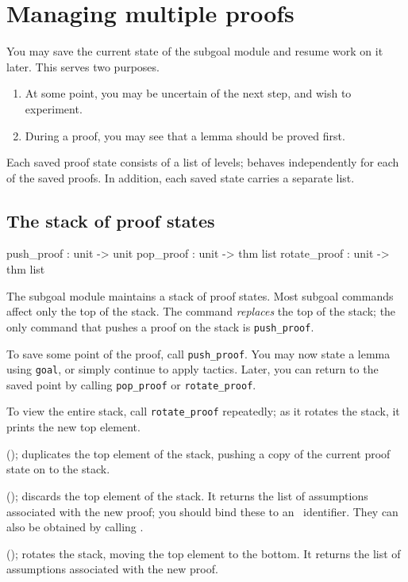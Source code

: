 \section{Managing multiple proofs}
You may save the current state of the subgoal module and resume work on it
later.  This serves two purposes.  
\begin{enumerate}
\item At some point, you may be uncertain of the next step, and
wish to experiment.

\item During a proof, you may see that a lemma should be proved first.
\end{enumerate}
Each saved proof state consists of a list of levels;  behaves
independently for each of the saved proofs.  In addition, each saved state
carries a separate  list.

\subsection{The stack of proof states}
\begin{ttbox} 
push_proof   : unit -> unit
pop_proof    : unit -> thm list
rotate_proof : unit -> thm list
\end{ttbox}
The subgoal module maintains a stack of proof states.  Most subgoal
commands affect only the top of the stack.  The  command {\em
replaces\/} the top of the stack; the only command that pushes a proof on the
stack is {\tt push_proof}.

To save some point of the proof, call {\tt push_proof}.  You may now
state a lemma using {\tt goal}, or simply continue to apply tactics.
Later, you can return to the saved point by calling {\tt pop_proof} or 
{\tt rotate_proof}. 

To view the entire stack, call {\tt rotate_proof} repeatedly; as it rotates
the stack, it prints the new top element.

\begin{ttdescription}
\item[\ttindexbold{push_proof}();]  
duplicates the top element of the stack, pushing a copy of the current
proof state on to the stack.

\item[\ttindexbold{pop_proof}();]  
discards the top element of the stack.  It returns the list of
assumptions associated with the new proof;  you should bind these to an
\ML\ identifier.  They can also be obtained by calling .

\item[\ttindexbold{rotate_proof}();]
rotates the stack, moving the top element to the bottom.  It returns the
list of assumptions associated with the new proof.
\end{ttdescription}


